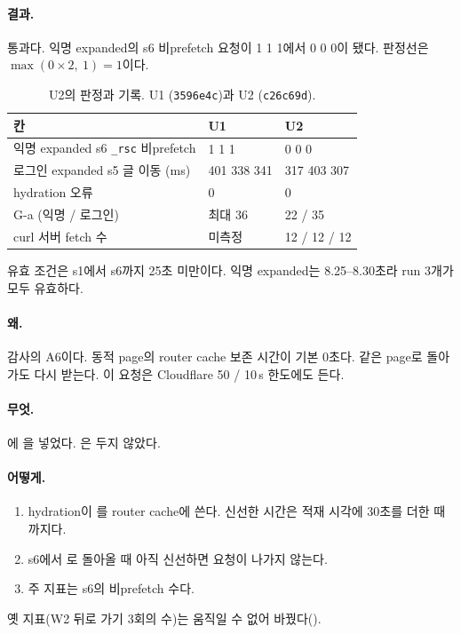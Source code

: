 \paragraph{결과.}
통과다. 익명 expanded의 s6  비prefetch 요청이 1 1 1에서 0 0 0이 됐다.
판정선은 $\max(0\times 2,\ 1)=1$이다.
\begin{table}[H]
  \caption{U2의 판정과 기록. U1 (\texttt{3596e4c})과 U2 (\texttt{c26c69d}).}
  \label{tab:re-u2}
  \centering\small
  \begin{tabularx}{\linewidth}{@{}Y L{2.6cm} L{2.6cm}@{}}
    \toprule
    칸 & U1 & U2 \\
    \midrule
    익명 expanded s6 \texttt{\_rsc} 비prefetch & 1 1 1 & 0 0 0 \\
    \midrule
    로그인 expanded s5 글 이동 (ms) & 401 338 341 & 317 403 307 \\
    \midrule
    hydration 오류 & 0 & 0 \\
    \midrule
    G-a (익명 / 로그인) & 최대 36 & 22 / 35 \\
    \midrule
    curl 서버 fetch 수 & 미측정 & 12 / 12 / 12 \\
    \bottomrule
  \end{tabularx}
\end{table}
유효 조건은 s1에서 s6까지 25초 미만이다. 익명 expanded는 8.25--8.30초라 run 3개가 모두 유효하다.

\paragraph{왜.}
감사의 A6이다. 동적 page의 router cache 보존 시간이 기본 0초다.
같은 page로 돌아가도 다시 받는다. 이 요청은 Cloudflare 50 / 10\,s 한도에도 든다.

\paragraph{무엇.}
에 을 넣었다.
은 두지 않았다.

\paragraph{어떻게.}
\begin{enumerate}[nosep]
  \item hydration이 \code{/}를 router cache에 쓴다. 신선한 시간은 적재 시각에 30초를 더한 때까지다.
  \item s6에서 \code{/}로 돌아올 때 아직 신선하면  요청이 나가지 않는다.
  \item 주 지표는 s6의  비prefetch 수다.
\end{enumerate}
옛 지표(W2 뒤로 가기 3회의  수)는 움직일 수 없어 바꿨다().

